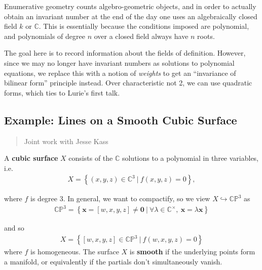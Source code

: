 Enumerative geometry counts algebro-geometric objects, and in order to
actually obtain an invariant number at the end of the day one uses an
algebraically closed field \(k\) or \({\mathbb{C}}\). This is
essentially because the conditions imposed are polynomial, and
polynomials of degree \(n\) over a closed field always have \(n\) roots.

The goal here is to record information about the fields of definition.
However, since we may no longer have invariant numbers as solutions to
polynomial equations, we replace this with a notion of \emph{weights} to
get an ``invariance of bilinear form'' principle instead. Over
characteristic not 2, we can use quadratic forms, which ties to Lurie's
first talk.

\hypertarget{example-lines-on-a-smooth-cubic-surface}{%
\subsection{Example: Lines on a Smooth Cubic
Surface}\label{example-lines-on-a-smooth-cubic-surface}}

\begin{quote}
Joint work with Jesse Kass
\end{quote}

\begin{definition}

A \textbf{cubic surface} \(X\) consists of the \({\mathbb{C}}\)
solutions to a polynomial in three variables, i.e.
\begin{align*}
X = \left\{{(x,y,z) \in {\mathbb{C}}^3 {~\mathrel{\Big|}~}f(x,y,z) = 0}\right\},
\end{align*}

where \(f\) is degree 3. In general, we want to compactify, so we view
\(X \hookrightarrow{\mathbb{CP}}^3\) as
\begin{align*}
{\mathbb{CP}}^3 = \left\{{\mathbf{x} = [w,x,y,z]\neq \mathbf{0} {~\mathrel{\Big|}~}\forall \lambda \in {\mathbb{C}}^\times,~\mathbf{x} = \lambda \mathbf{x}}\right\}
\end{align*}

and so
\begin{align*}
X = \left\{{[w,x,y,z] \in {\mathbb{CP}}^3 {~\mathrel{\Big|}~}f(w,x,y,z) = 0}\right\}
\end{align*}
where \(f\) is homogeneous. The surface \(X\) is \textbf{smooth} if the
underlying points form a manifold, or equivalently if the partials don't
simultaneously vanish.

\end{definition}

